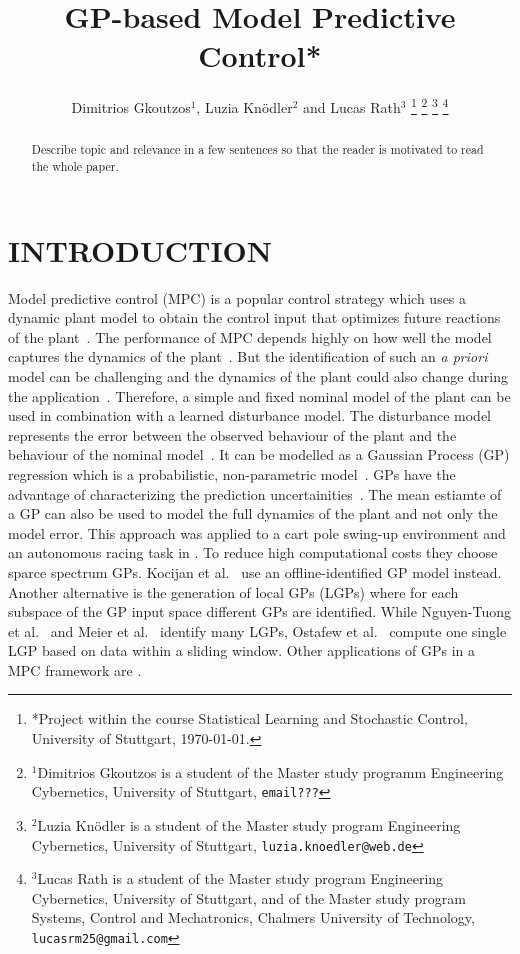 \documentclass[letterpaper, 10 pt, conference]{ieeeconf}  %
\title{\LARGE \bf
GP-based Model Predictive Control*
}
\author{Dimitrios Gkoutzos$^{1}$, Luzia Knödler$^{2}$ and Lucas Rath$^{3}$%
\thanks{*Project within the course Statistical Learning and Stochastic Control, University of Stuttgart, \today.}%
\thanks{$^{1}$Dimitrios Gkoutzos is a student of the Master study programm Engineering Cybernetics, University of Stuttgart,
        {\tt\small email???}}%
\thanks{$^{2}$Luzia Knödler is a student of the Master study program Engineering Cybernetics, University of Stuttgart,
        {\tt\small luzia.knoedler@web.de}}%
\thanks{$^{3}$Lucas Rath is a student of the Master study program Engineering Cybernetics, University of Stuttgart, and of the Master study program Systems, Control and Mechatronics, Chalmers University of Technology,
        {\tt\small lucasrm25@gmail.com}}%
}
\begin{document}
\maketitle
\thispagestyle{empty}
\pagestyle{empty}


\begin{abstract}

Describe topic and relevance in a few sentences so that the reader is motivated to
read the whole paper.

\end{abstract}


\section{INTRODUCTION}
Model predictive control (MPC) is a popular control strategy which uses a dynamic plant model to obtain the control input that optimizes future reactions of the plant~\cite{kocijan2004gaussian}. The performance of MPC depends highly on how well the model captures the dynamics of the plant~\cite{kabzan2019learning}. But the identification of such an \textit{a priori} model can be challenging and the dynamics of the plant could also change during the application~\cite{kabzan2019learning,ostafew2014learning}. Therefore, a simple and fixed nominal model of the plant can be used in combination with a learned disturbance model. The disturbance model represents the error between the observed behaviour of the plant and the behaviour of the nominal model~\cite{ostafew2014learning}. It can be modelled as a Gaussian Process (GP) regression which is a probabilistic, non-parametric model~\cite{kocijan2004gaussian}. GPs have the advantage of characterizing the prediction uncertainities~\cite{kocijan2004gaussian}. The mean estiamte of a GP can also be used to model the full dynamics of the plant and not only the model error. This approach was applied to a cart pole swing-up environment and an autonomous racing task in \cite{van2017online}. To reduce high computational costs they choose sparce spectrum GPs. Kocijan et al.~\cite{kocijan2004gaussian} use an offline-identified GP model instead. Another alternative is the generation of local GPs (LGPs) where for each subspace of the GP input space different GPs are identified. While Nguyen-Tuong et al.~\cite{nguyen2009local} and Meier et al.~\cite{meier2014efficient} identify many LGPs, Ostafew et al.~\cite{ostafew2014learning} compute one single LGP based on data within a sliding window. Other applications of GPs in a MPC framework are .
\end{document}
